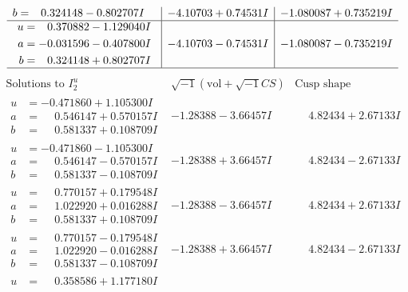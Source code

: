 \documentclass[1p]{elsarticle_modified}
\theoremstyle{definition}
\newcommand{\I}{\sqrt{-1}}
\begin{document}
$$\begin{array}{c|c|c}
\begin{aligned}
b &= \phantom{-}0.324148 - 0.802707 I\end{aligned}
 & -4.10703 + 0.74531 I & -1.080087 + 0.735219 I \\ \hline\begin{aligned}
u &= \phantom{-}0.370882 - 1.129040 I \\
a &= -0.031596 - 0.407800 I \\
b &= \phantom{-}0.324148 + 0.802707 I\end{aligned}
 & -4.10703 - 0.74531 I & -1.080087 - 0.735219 I\\
 \hline 
 \end{array}$$\newpage$$\begin{array}{c|c|c}  
\text{Solutions to }I^u_{2}& \I (\text{vol} + \sqrt{-1}CS) & \text{Cusp shape}\\
 \hline 
\begin{aligned}
u &= -0.471860 + 1.105300 I \\
a &= \phantom{-}0.546147 + 0.570157 I \\
b &= \phantom{-}0.581337 + 0.108709 I\end{aligned}
 & -1.28388 - 3.66457 I & \phantom{-}4.82434 + 2.67133 I \\ \hline\begin{aligned}
u &= -0.471860 - 1.105300 I \\
a &= \phantom{-}0.546147 - 0.570157 I \\
b &= \phantom{-}0.581337 - 0.108709 I\end{aligned}
 & -1.28388 + 3.66457 I & \phantom{-}4.82434 - 2.67133 I \\ \hline\begin{aligned}
u &= \phantom{-}0.770157 + 0.179548 I \\
a &= \phantom{-}1.022920 + 0.016288 I \\
b &= \phantom{-}0.581337 + 0.108709 I\end{aligned}
 & -1.28388 - 3.66457 I & \phantom{-}4.82434 + 2.67133 I \\ \hline\begin{aligned}
u &= \phantom{-}0.770157 - 0.179548 I \\
a &= \phantom{-}1.022920 - 0.016288 I \\
b &= \phantom{-}0.581337 - 0.108709 I\end{aligned}
 & -1.28388 + 3.66457 I & \phantom{-}4.82434 - 2.67133 I \\ \hline\begin{aligned}
u &= \phantom{-}0.358586 + 1.177180 I \\

\end{aligned}
\end{array}$$
\end{document}

